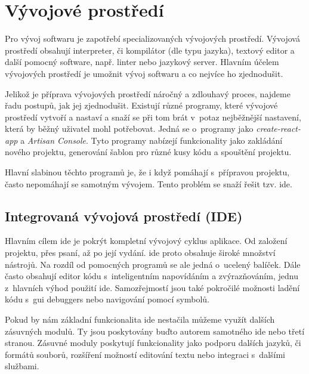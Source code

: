\section{Vývojové prostředí}
\label{sub:development-enviroment}

Pro vývoj softwaru je zapotřebí specializovaných vývojových prostředí. Vývojová prostředí obsahují interpreter, či kompilátor (dle typu jazyka)\cite{interpreter-vs-compiler}, textový editor a další pomocný software, např. linter\cite{linter} nebo jazykový server\cite{language-server}. Hlavním účelem vývojových prostředí je umožnit vývoj softwaru a co nejvíce ho zjednodušit. 

Jelikož je příprava vývojových prostředí náročný a zdlouhavý proces, najdeme řadu postupů, jak jej zjednodušit. Existují různé programy, které vývojové prostředí vytvoří a nastaví a snaží se při tom brát v~potaz nejběžnější nastavení, která by běžný uživatel mohl potřebovat. Jedná se o~programy jako \emph{create-react-app}\cite{create-react-app} a \emph{Artisan Console}\cite{laravel-artisan}. Tyto programy nabízejí funkcionality jako zakládání nového projektu, generování šablon pro různé kusy kódu a spouštění projektu.

Hlavní slabinou těchto programů je, že i když pomáhají s~přípravou projektu, často nepomáhají se samotným vývojem. Tento problém se snaží řešit tzv. \acrfull{ide}\cite{ide}.  

\subsection{Integrovaná vývojová prostředí (IDE)}

Hlavním cílem \acrshort{ide} je pokrýt kompletní vývojový cyklus aplikace. Od založení projektu, přes psaní, až po její vydání. \acrshort{ide} proto obsahuje široké množství nástrojů. Na rozdíl od pomocných programů se ale jedná o~ucelený balíček. Dále často obsahují editor kódu s~inteligentním napovídáním a zvýrazňováním, jednu z~hlavních výhod použití \acrshort{ide}. Samozřejmostí jsou také pokročilé možnosti ladění kódu s~\acrshort{gui} \glspl{debugger} nebo navigování pomocí symbolů.

Pokud by nám základní funkcionalita \acrshort{ide} nestačila můžeme využít dalších zásuvných modulů. Ty jsou poskytovány buďto autorem samotného \acrshort{ide} nebo třetí stranou. Zásuvné moduly poskytují funkcionality jako podporu dalších jazyků, či formátů souborů, rozšíření možností editování textu nebo integraci s~dalšími službami.
